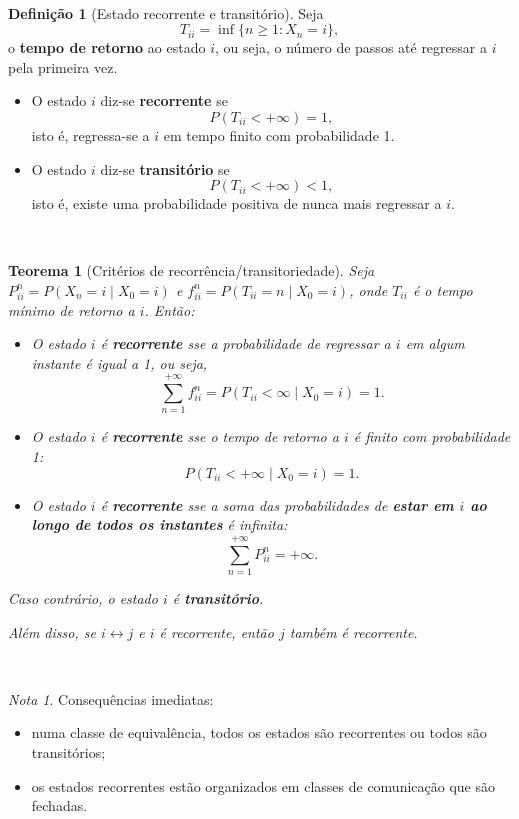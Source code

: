 \documentclass[
  11pt,
  a4paper,
]{book}
\newtheorem{theorem}{Teorema}[chapter]
\theoremstyle{definition}
\newtheorem{definition}{Definição}[chapter]
\theoremstyle{definition}
\theoremstyle{definition}
\theoremstyle{definition}
\theoremstyle{remark}
\newtheorem*{remark}{Nota }
\begin{document}
\(\,\)

\begin{definition}[Estado recorrente e transitório]

Seja
\[
T_{ii} = \inf \{ n \ge 1 : X_n = i \},
\]
o \textbf{tempo de retorno} ao estado \(i\), ou seja, o número de passos até regressar a \(i\) pela primeira vez.

\begin{itemize}
\item
  O estado \(i\) diz-se \textbf{recorrente} se
  \[
  P(T_{ii} < +\infty) = 1,
  \]
  isto é, regressa-se a \(i\) em tempo finito com probabilidade 1.
\item
  O estado \(i\) diz-se \textbf{transitório} se
  \[
  P(T_{ii} < +\infty) < 1,
  \]
  isto é, existe uma probabilidade positiva de nunca mais regressar a \(i\).
\end{itemize}

\end{definition}

\(\,\)

\begin{theorem}[Critérios de recorrência/transitoriedade]
Seja \(P_{ii}^n = P(X_n=i \mid X_0=i)\) e \(f_{ii}^n = P(T_{ii}=n \mid X_0=i)\), onde \(T_{ii}\) é o tempo mínimo de retorno a \(i\). Então:

\begin{itemize}
\item
  O estado \(i\) é \textbf{recorrente} sse a probabilidade de regressar a \(i\) em algum instante é igual a 1, ou seja,
  \[
  \sum_{n=1}^{+\infty} f_{ii}^n = P(T_{ii}<\infty \mid X_0=i) = 1.
  \]
\item
  O estado \(i\) é \textbf{recorrente} sse o tempo de retorno a \(i\) é finito com probabilidade 1:
  \[
  P(T_{ii} < +\infty \mid X_0=i) = 1.
  \]
\item
  O estado \(i\) é \textbf{recorrente} sse a soma das probabilidades de \textbf{estar em \(i\) ao longo de todos os instantes} é infinita:
  \[
  \sum_{n=1}^{+\infty} P_{ii}^n = +\infty.
  \]
\end{itemize}

Caso contrário, o estado \(i\) é \textbf{transitório}.

Além disso, se \(i \longleftrightarrow j\) e \(i\) é recorrente, então \(j\) também é recorrente.
\end{theorem}

\(\,\)

\begin{remark}

Consequências imediatas:

\begin{itemize}
\item
  numa classe de equivalência, todos os estados são recorrentes ou todos são transitórios;
\item
  os estados recorrentes estão organizados em classes de comunicação que são fechadas.
\end{itemize}

\end{remark}
\end{document}
